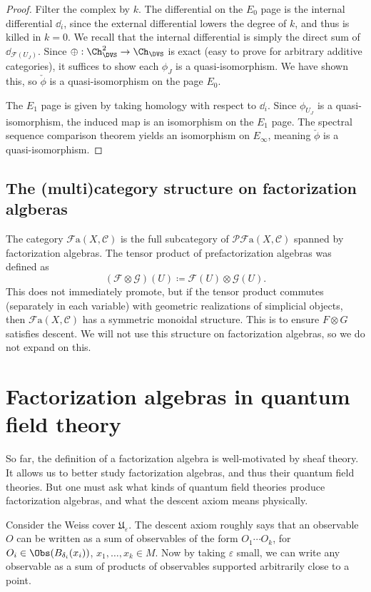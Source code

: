 \begin{proof}
	Filter the complex by $k$. The differential on the $E_0$ page is the internal differential $\dd _i$, since the external differential lowers the degree of $k$, and thus is killed in $k=0$. We recall that the internal differential is simply the direct sum of $\dd _{\mathcal{F}(U_J)}$. Since $\oplus : \Ch_{\DVS } ^2 \to \Ch_{\DVS } $ is exact (easy to prove for arbitrary additive categories), it suffices to show each $\phi _J$ is a quasi-isomorphism. We have shown this, so $\check{\phi }$ is a quasi-isomorphism on the page $E_0$.

	The $E_1$ page is given by taking homology with respect to $\dd _i$. Since $\phi _{U_J} $ is a quasi-isomorphism, the induced map is an isomorphism on the $E_1$ page. The spectral sequence comparison theorem yields an isomorphism on $E_{\infty } $, meaning $\check{\phi }$ is a quasi-isomorphism.
\end{proof}

\subsection{The (multi)category structure on factorization algberas}

The category $\mathcal{F} \mathrm{a}(X,\mathcal{C} )$ is the full subcategory of $\mathcal{P}\mathcal{F}\mathrm{a}(X,\mathcal{C} )$ spanned by factorization algebras. The tensor product of prefactorization algebras was defined as
\[
	(\mathcal{F} \otimes \mathcal{G})(U) \coloneqq \mathcal{F} (U)\otimes \mathcal{G} (U).
\]
This does not immediately promote,  but if the tensor product commutes (separately in each variable) with geometric realizations of simplicial objects, then $\mathcal{F} \mathrm{a} (X,\mathcal{C} )$ has a symmetric monoidal structure. This is to ensure $F\otimes G$ satisfies descent. We will not use this structure on factorization algebras, so we do not expand on this.

\section{Factorization algebras in quantum field theory}

So far, the definition of a factorization algebra is well-motivated by sheaf theory. It allows us to better study factorization algebras, and thus their quantum field theories. But one must ask what kinds of quantum field theories produce factorization algebras, and what the descent axiom means physically.

Consider the Weiss cover $\mathfrak{U} _{\varepsilon } $. The descent axiom roughly says that an observable $O$ can be written as a sum of observables of the form $O_1 \cdots O_k$, for $O_i\in \Obs(B_{\delta _i} (x_i))$, $x_1, \ldots , x_k\in M$. Now by taking $\varepsilon $ small, we can write any observable as a sum of products of observables supported arbitrarily close to a point.

